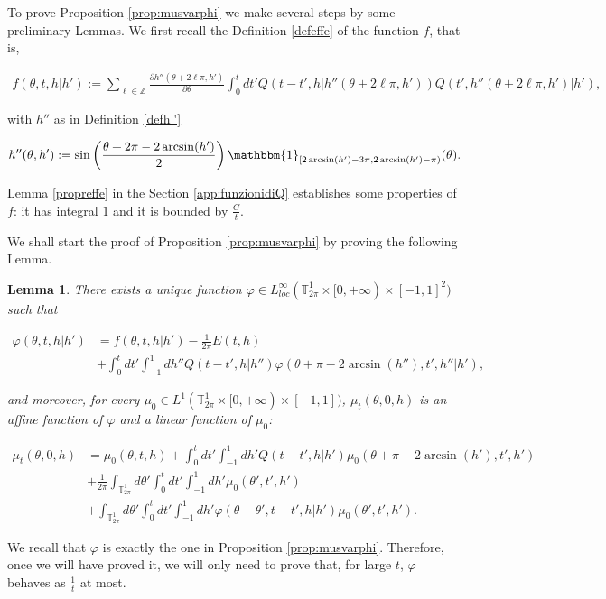 \documentclass[a4paper,10pt,reqno]{amsart}
\newtheorem{lemma}{Lemma}[section]
\numberwithin{equation}{subsection}
\numberwithin{figure}{subsection}
\begin{document}
To prove Proposition \ref{prop:musvarphi} we make several steps by some preliminary Lemmas. We first recall the Definition \ref{defeffe} of the function $f$, that is,

{\footnotesize\begin{align*}
f(\theta,t,h|h'):=\sum_{\ell\in\mathbb{Z}}\frac{\partial h''(\theta+2\ell\pi,h')}{\partial\theta}\int_0^tdt' Q(t-t',h|h''(\theta+2\ell\pi,h'))Q(t',h''(\theta+2\ell\pi,h')|h'),
\end{align*}}

with $h''$ as in Definition \ref{defh''}

\begin{align*}
h''(\theta,h'):=\sin\left(\frac{\theta+2\pi-2\arcsin(h')}{2}\right)\mathbbm{1}_{[2\arcsin(h')-3\pi,2\arcsin(h')-\pi)}(\theta).
\end{align*}

Lemma \ref{propreffe} in the Section \ref{app:funzionidiQ} establishes some properties of $f$: it has integral $1$ and it is bounded by $\frac{C}{t}$.

We shall start the proof of Proposition \ref{prop:musvarphi} by proving the following Lemma.
\begin{lemma}\label{lemma:esphi}
There exists a unique function $\varphi\in L^{\infty}_{loc}(\mathbb{T}^1_{2\pi}\times[0,+\infty)\times[-1,1]^2)$ such that

\begin{align}
\nonumber\varphi(\theta,t,h|h')&=f(\theta,t,h|h')-\frac{1}{2\pi}E(t,h)
\\
\label{espr:phi}&+\int_0^tdt'\int_{-1}^1dh''Q(t-t',h|h'')\varphi(\theta+\pi-2\arcsin(h''),t',h''|h'),
\end{align}

and moreover, for every $\mu_0\in L^1(\mathbb{T}^1_{2\pi}\times[0,+\infty)\times[-1,1])$, $\mu_t(\theta,0,h)$ is an affine function of $\varphi$ and a linear function of $\mu_0$:

\begin{align}
\nonumber\mu_t(\theta,0,h)&=\mu_0(\theta,t,h)+\int_0^tdt'\int_{-1}^1dh'Q(t-t',h|h')\mu_0(\theta+\pi-2\arcsin(h'),t',h')
\\
\nonumber&+\frac{1}{2\pi}\int_{\mathbb{T}^1_{2\pi}}d\theta'\int_0^tdt'\int_{-1}^1dh'\mu_0(\theta',t',h')
\\
\label{rapp:musphi}&+\int_{\mathbb{T}^1_{2\pi}}d\theta'\int_0^tdt'\int_{-1}^1dh'\varphi(\theta-\theta',t-t',h|h')\mu_0(\theta',t',h').
\end{align}

\end{lemma}
We recall that $\varphi$ is exactly the one in Proposition \ref{prop:musvarphi}. Therefore, once we will have proved it, we will only need to prove that, for large $t$, $\varphi$ behaves as $\frac{1}{t}$ at most.
\end{document}
